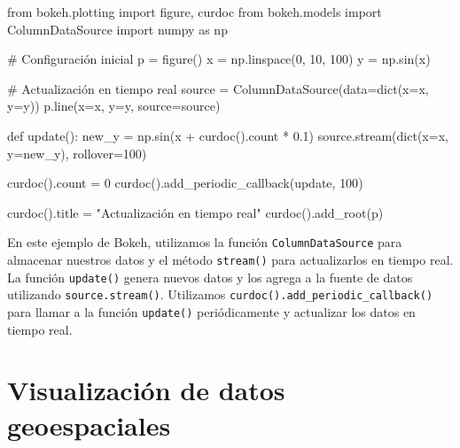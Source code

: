 \documentclass[
  a4paper,
]{article}
\newenvironment{Shaded}{}{}
\newcommand{\BuiltInTok}[1]{\textcolor[rgb]{0.84,0.23,0.29}{#1}}
\newcommand{\CommentTok}[1]{\textcolor[rgb]{0.42,0.45,0.49}{#1}}
\newcommand{\DecValTok}[1]{\textcolor[rgb]{0.00,0.36,0.77}{#1}}
\newcommand{\FloatTok}[1]{\textcolor[rgb]{0.00,0.36,0.77}{#1}}
\newcommand{\ImportTok}[1]{\textcolor[rgb]{0.01,0.18,0.38}{#1}}
\newcommand{\KeywordTok}[1]{\textcolor[rgb]{0.84,0.23,0.29}{#1}}
\newcommand{\NormalTok}[1]{\textcolor[rgb]{0.14,0.16,0.18}{#1}}
\newcommand{\OperatorTok}[1]{\textcolor[rgb]{0.14,0.16,0.18}{#1}}
\newcommand{\StringTok}[1]{\textcolor[rgb]{0.01,0.18,0.38}{#1}}
\begin{document}
\begin{Shaded}
\begin{Highlighting}[]
\ImportTok{from}\NormalTok{ bokeh.plotting }\ImportTok{import}\NormalTok{ figure, curdoc}
\ImportTok{from}\NormalTok{ bokeh.models }\ImportTok{import}\NormalTok{ ColumnDataSource}
\ImportTok{import}\NormalTok{ numpy }\ImportTok{as}\NormalTok{ np}

\CommentTok{\# Configuración inicial}
\NormalTok{p }\OperatorTok{=}\NormalTok{ figure()}
\NormalTok{x }\OperatorTok{=}\NormalTok{ np.linspace(}\DecValTok{0}\NormalTok{, }\DecValTok{10}\NormalTok{, }\DecValTok{100}\NormalTok{)}
\NormalTok{y }\OperatorTok{=}\NormalTok{ np.sin(x)}

\CommentTok{\# Actualización en tiempo real}
\NormalTok{source }\OperatorTok{=}\NormalTok{ ColumnDataSource(data}\OperatorTok{=}\BuiltInTok{dict}\NormalTok{(x}\OperatorTok{=}\NormalTok{x, y}\OperatorTok{=}\NormalTok{y))}
\NormalTok{p.line(x}\OperatorTok{=}\StringTok{\textquotesingle{}x\textquotesingle{}}\NormalTok{, y}\OperatorTok{=}\StringTok{\textquotesingle{}y\textquotesingle{}}\NormalTok{, source}\OperatorTok{=}\NormalTok{source)}

\KeywordTok{def}\NormalTok{ update():}
\NormalTok{    new\_y }\OperatorTok{=}\NormalTok{ np.sin(x }\OperatorTok{+}\NormalTok{ curdoc().count }\OperatorTok{*} \FloatTok{0.1}\NormalTok{)}
\NormalTok{    source.stream(}\BuiltInTok{dict}\NormalTok{(x}\OperatorTok{=}\NormalTok{x, y}\OperatorTok{=}\NormalTok{new\_y), rollover}\OperatorTok{=}\DecValTok{100}\NormalTok{)}

\NormalTok{curdoc().count }\OperatorTok{=} \DecValTok{0}
\NormalTok{curdoc().add\_periodic\_callback(update, }\DecValTok{100}\NormalTok{)}

\NormalTok{curdoc().title }\OperatorTok{=} \StringTok{"Actualización en tiempo real"}
\NormalTok{curdoc().add\_root(p)}
\end{Highlighting}
\end{Shaded}

En este ejemplo de Bokeh, utilizamos la función
\texttt{ColumnDataSource} para almacenar nuestros datos y el método
\texttt{stream()} para actualizarlos en tiempo real. La función
\texttt{update()} genera nuevos datos y los agrega a la fuente de datos
utilizando \texttt{source.stream()}. Utilizamos
\texttt{curdoc().add\_periodic\_callback()} para llamar a la función
\texttt{update()} periódicamente y actualizar los datos en tiempo real.

\hypertarget{visualizaciuxf3n-de-datos-geoespaciales}{%
\section{Visualización de datos
geoespaciales}\label{visualizaciuxf3n-de-datos-geoespaciales}}
\end{document}
